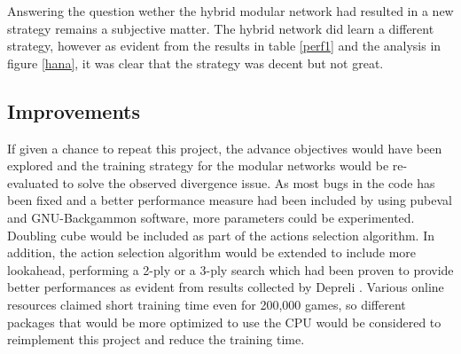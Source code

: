 \documentclass[12pt,a4paper]{article}
\begin{document}
Answering the question wether the hybrid modular network had resulted in a new strategy remains a subjective matter. The hybrid network did learn a different strategy, however as evident from the results in table \ref{perf1} and the analysis in figure \ref{hana}, it was clear that the strategy was decent but not great. 

\subsection{Improvements}
If given a chance to repeat this project, the advance objectives would have been explored and the training strategy for the modular networks would be re-evaluated to solve the observed divergence issue. As most bugs in the code has been fixed and a better performance measure had been included by using pubeval and GNU-Backgammon software, more parameters could be experimented. Doubling cube would be included as part of the actions selection algorithm. In addition, the action selection algorithm would be extended to include more lookahead, performing a 2-ply or a 3-ply search which had been proven to provide better performances as evident from results collected by Depreli \citeyear{botbattle}. Various online resources claimed short training time even for 200,000 games, so different packages that would be more optimized to use the CPU would be considered to reimplement this project and reduce the training time.
\end{document}
